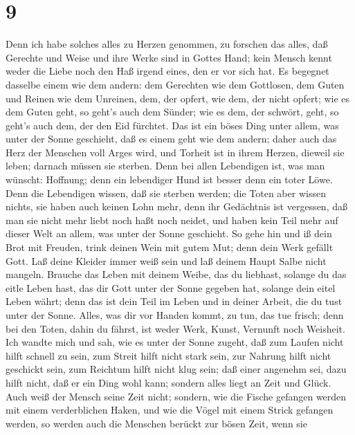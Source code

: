\hypertarget{section-8}{%
\section{9}\label{section-8}}

 Denn ich habe solches alles zu Herzen genommen, zu forschen
das alles, daß Gerechte und Weise und ihre Werke sind in Gottes Hand;
kein Mensch kennt weder die Liebe noch den Haß irgend eines, den er vor
sich hat.  Es begegnet dasselbe einem wie dem andern: dem
Gerechten wie dem Gottlosen, dem Guten und Reinen wie dem Unreinen, dem,
der opfert, wie dem, der nicht opfert; wie es dem Guten geht, so geht's
auch dem Sünder; wie es dem, der schwört, geht, so geht's auch dem, der
den Eid fürchtet.  Das ist ein böses Ding unter allem, was
unter der Sonne geschieht, daß es einem geht wie dem andern; daher auch
das Herz der Menschen voll Arges wird, und Torheit ist in ihrem Herzen,
dieweil sie leben; darnach müssen sie sterben.  Denn bei
allen Lebendigen ist, was man wünscht: Hoffnung; denn ein lebendiger
Hund ist besser denn ein toter Löwe.  Denn die Lebendigen
wissen, daß sie sterben werden; die Toten aber wissen nichts, sie haben
auch keinen Lohn mehr, denn ihr Gedächtnis ist vergessen, 
daß man sie nicht mehr liebt noch haßt noch neidet, und haben kein Teil
mehr auf dieser Welt an allem, was unter der Sonne geschieht.
 So gehe hin und iß dein Brot mit Freuden, trink deinen Wein
mit gutem Mut; denn dein Werk gefällt Gott.  Laß deine
Kleider immer weiß sein und laß deinem Haupt Salbe nicht mangeln.
 Brauche das Leben mit deinem Weibe, das du liebhast,
solange du das eitle Leben hast, das dir Gott unter der Sonne gegeben
hat, solange dein eitel Leben währt; denn das ist dein Teil im Leben und
in deiner Arbeit, die du tust unter der Sonne.  Alles, was
dir vor Handen kommt, zu tun, das tue frisch; denn bei den Toten, dahin
du fährst, ist weder Werk, Kunst, Vernunft noch Weisheit. 
Ich wandte mich und sah, wie es unter der Sonne zugeht, daß zum Laufen
nicht hilft schnell zu sein, zum Streit hilft nicht stark sein, zur
Nahrung hilft nicht geschickt sein, zum Reichtum hilft nicht klug sein;
daß einer angenehm sei, dazu hilft nicht, daß er ein Ding wohl kann;
sondern alles liegt an Zeit und Glück.  Auch weiß der
Mensch seine Zeit nicht; sondern, wie die Fische gefangen werden mit
einem verderblichen Haken, und wie die Vögel mit einem Strick gefangen
werden, so werden auch die Menschen berückt zur bösen Zeit, wenn sie
